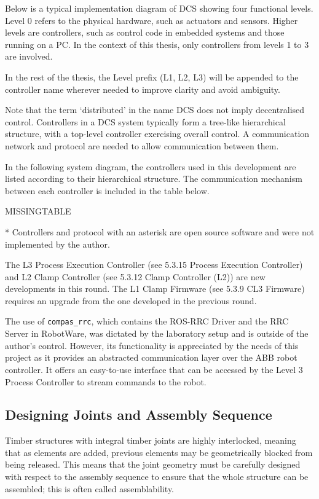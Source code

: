 Below is a typical implementation diagram of DCS showing four functional levels. Level 0 refers to the physical hardware, such as actuators and sensors. Higher levels are controllers, such as control code in embedded systems and those running on a PC. In the context of this thesis, only controllers from levels 1 to 3 are involved.

In the rest of the thesis, the Level prefix (L1, L2, L3) will be appended to the controller name wherever needed to improve clarity and avoid ambiguity.

Note that the term ‘distributed’ in the name DCS does not imply decentralised control. Controllers in a DCS system typically form a tree-like hierarchical structure, with a top-level controller exercising overall control. A communication network and protocol are needed to allow communication between them. 

In the following system diagram, the controllers used in this development are listed according to their hierarchical structure. The communication mechanism between each controller is included in the table below.

MISSINGTABLE

* Controllers and protocol with an asterisk are open source software and were not implemented by the author.

The L3 Process Execution Controller (see 5.3.15 Process Execution Controller) and L2 Clamp Controller (see 5.3.12 Clamp Controller (L2)) are new developments in this round. The L1 Clamp Firmware (see 5.3.9 CL3 Firmware) requires an upgrade from the one developed in the previous round. 

The use of \verb|compas_rrc|, which contains the ROS-RRC Driver and the RRC Server in RobotWare, was dictated by the laboratory setup and is outside of the author’s control. However, its functionality is appreciated by the needs of this project as it provides an abstracted communication layer over the ABB robot controller. It offers an easy-to-use interface that can be accessed by the Level 3 Process Controller to stream commands to the robot.
\subsection{Designing Joints and Assembly Sequence}
Timber structures with integral timber joints are highly interlocked, meaning that as elements are added, previous elements may be geometrically blocked from being released. This means that the joint geometry must be carefully designed with respect to the assembly sequence to ensure that the whole structure can be assembled; this is often called assemblability. 

